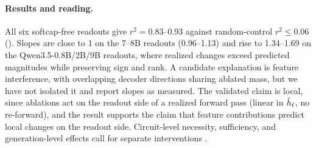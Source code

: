 \paragraph{Results and reading.}
All six softcap-free readouts give
\(r^2=0.83\)--\(0.93\) against random-control
\(r^2\le 0.06\) (). Slopes are
close to 1 on the 7--8B readouts (0.96--1.13) and rise to 1.34--1.69 on
the Qwen3.5-0.8B/2B/9B readouts, where realized changes exceed
predicted magnitudes while preserving sign and rank. A candidate
explanation is feature interference, with overlapping decoder directions
sharing ablated mass, but we have not isolated it and report slopes as
measured. The validated claim is local, since
ablations act on the readout side of a realized forward pass (linear in
\(\tilde h_\ell\), no re-forward), and the result supports the claim that feature
contributions predict local changes on the readout side. Circuit-level necessity,
sufficiency, and generation-level effects call for separate
interventions \citep{conmy2023acdc,geiger2023causalabstraction}.
